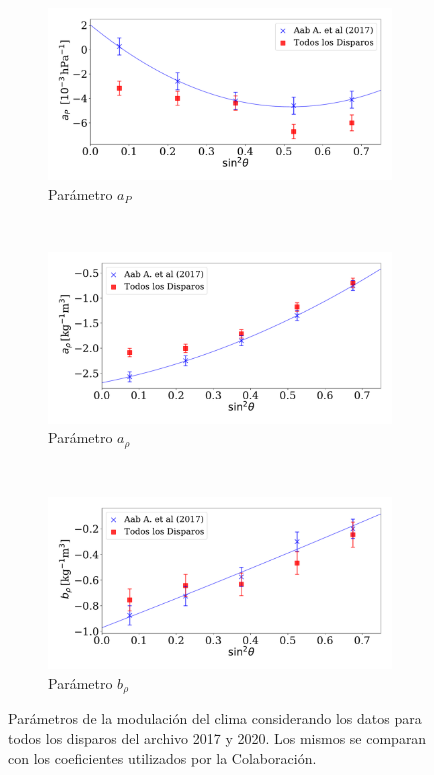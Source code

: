         \begin{figure}[H]
          \centering
          \begin{subfigure}[b]{0.8\textwidth}
          \includegraphics[width=\linewidth]{../04_Clima/Graphs/params/ap_AllTriggers.pdf}
          \caption{Parámetro $a_P$ }
          \end{subfigure}\\
          \begin{subfigure}[b]{0.8\textwidth}
          \includegraphics[width=\linewidth]{../04_Clima/Graphs/params/arho_AllTriggers.pdf}
          \caption{Parámetro $a_{\rho}$ }
          \end{subfigure}\\
          \begin{subfigure}[b]{\textwidth}
          \centering
          \includegraphics[width=0.8\linewidth]{../04_Clima/Graphs/params/brho_AllTriggers.pdf}
          \caption{Parámetro  $b_\rho$   }
          \end{subfigure}
          \caption{Parámetros de la modulación del clima considerando los datos para todos los disparos del archivo 2017 y 2020. Los mismos se comparan con los coeficientes utilizados por la Colaboración.}
        \end{figure}

